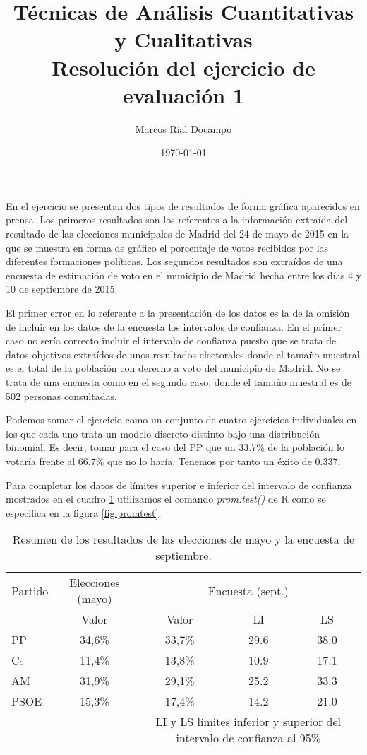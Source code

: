 \documentclass[11pt,a4paper]{article}
\author{Marcos Rial Docampo}
\title{Técnicas de Análisis Cuantitativas y Cualitativas\\Resolución del ejercicio de evaluación 1}
\date{\small{\today}}
\begin{document}
\maketitle

En el ejercicio se presentan dos tipos de resultados de forma gráfica aparecidos en prensa. Los primeros resultados son los referentes a la información extraída del resultado de las elecciones municipales de Madrid del 24 de mayo de 2015 en la que se muestra en forma de gráfico el porcentaje de votos recibidos por las diferentes formaciones políticas. Los segundos resultados son extraídos de una encuesta de estimación de voto en el municipio de Madrid hecha entre los días 4 y 10 de septiembre de 2015.

El primer error en lo referente a la presentación de los datos es la de la omisión de incluir en los datos de la encuesta los intervalos de confianza. En el primer caso no sería correcto incluir el intervalo de confianza puesto que se trata de datos objetivos extraídos de unos resultados electorales donde el tamaño muestral es el total de la población con derecho a voto del municipio de Madrid. No se trata de una encuesta como en el segundo caso, donde el tamaño muestral es de 502 personas consultadas.

Podemos tomar el ejercicio como un conjunto de cuatro ejercicios individuales en los que cada uno trata un modelo discreto distinto bajo una distribución binomial. Es decir, tomar para el caso del PP que un 33.7\% de la población lo votaría frente al 66.7\% que no lo haría. Tenemos por tanto un éxito de 0.337.

Para completar los datos de límites superior e inferior del intervalo de confianza mostrados en el cuadro \ref{tab:resumen} utilizamos el comando \textit{prom.test()} de R como se especifica en la figura \ref{fig:promtest}.

\begin{table}
	\centering
	\begin{tabular}{lcccc}
	\toprule[0.4mm]
	Partido & Elecciones (mayo) & \multicolumn{3}{c}{Encuesta (sept.)}\\
	& Valor & Valor & LI & LS \\
	\midrule
	PP & 34,6\% & 33,7\% & 29.6 & 38.0 \\
	Cs & 11,4\% & 13,8\% & 10.9 & 17.1 \\
	AM & 31,9\% & 29,1\% & 25.2 & 33.3 \\
	PSOE & 15,3\% & 17,4\% & 14.2 & 21.0 \\
	\bottomrule[0.4mm]
	& & \multicolumn{3}{p{3.4cm}}{\footnotesize{LI y LS límites inferior y superior del intervalo de confianza al 95\%}}
	\end{tabular}
	\caption{Resumen de los resultados de las elecciones de mayo y la encuesta de septiembre.}
\label{tab:resumen}
\end{table}
\end{document}

